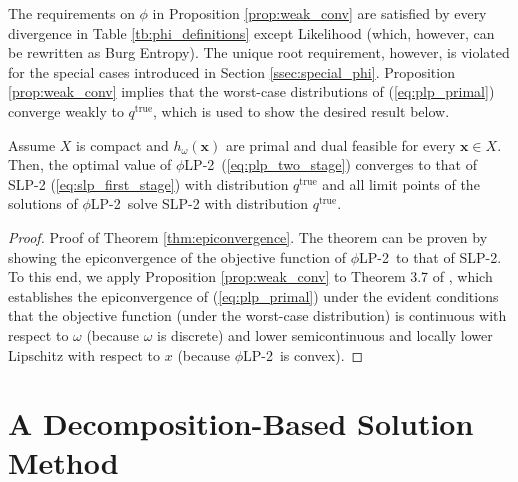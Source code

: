 \documentclass[opre,nonblindrev]{informs3} %
\newcommand{\x}{\mathbf{x}}
\newcommand{\qtrue}{q^{\text{true}}}
\newcommand{\plp}{$\phi$LP-2}
\begin{document}
The requirements on $\phi$ in Proposition \ref{prop:weak_conv} are satisfied by every divergence in Table \ref{tb:phi_definitions} except Likelihood (which, however, can be rewritten as Burg Entropy).
The unique root requirement, however, is violated for the special cases introduced in Section \ref{ssec:special_phi}.
Proposition \ref{prop:weak_conv} implies that the worst-case distributions of (\ref{eq:plp_primal}) converge weakly to $\qtrue$, which is used to show the desired result below. 
\begin{theorem}
	\label{thm:epiconvergence}
	Assume $X$ is compact and $h_\omega(\x)$ are primal and dual feasible for every $\x \in X$.
	Then, the optimal value of \plp\ (\ref{eq:plp_two_stage}) converges to that of SLP-2 (\ref{eq:slp_first_stage}) with distribution $\qtrue$ and all limit points of the solutions of \plp\ solve SLP-2 with distribution $\qtrue$.
\end{theorem}

\begin{proof}{\sc Proof of Theorem \ref{thm:epiconvergence}.}
	The theorem can be proven by showing the epiconvergence of the objective function of \plp\ to that of SLP-2.
	To this end, we apply Proposition \ref{prop:weak_conv} to Theorem 3.7 of \cite{dupacova1988asymptotic}, which establishes the epiconvergence of (\ref{eq:plp_primal}) under the evident conditions that the objective function (under the worst-case distribution) is continuous with respect to $\omega$ (because $\omega$ is discrete) and lower semicontinuous and locally lower Lipschitz with respect to $x$ (because \plp\ is convex).
	\Halmos
\end{proof}

\section{A Decomposition-Based Solution Method}
\label{sec:soln_algorithm}
\end{document}
